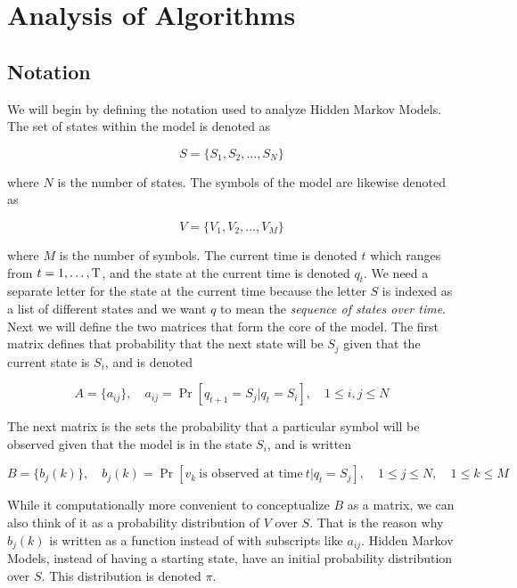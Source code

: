 
\section{Analysis of Algorithms}
\subsection{Notation}

We will begin by defining the notation used to analyze Hidden Markov
Models. The set of states within the model is denoted as

\begin{equation}
  S = \{S_1, S_2, \ldots, S_N \}
\end{equation}

where $N$ is the number of states. The symbols of the model are likewise
denoted as

\begin{equation}
  V = \{V_1, V_2, \ldots, V_M \}
\end{equation}

where $M$ is the number of symbols. The current time is denoted $t$
which ranges from $t=1, \ldots, \mathrm{T}$, and the state at the current
time is denoted $q_t$. We need a separate letter for the state at the
current time because the letter $S$ is indexed as a list of different
states and we want $q$ to mean the \emph{sequence of states over time}.
Next we will define the two matrices that form the core of the model.
The first matrix defines that probability that the next state will be
$S_j$ given that the current state is $S_i$, and is denoted

\begin{equation}
  A = \{a_{ij}\}, \quad a_{ij} = \Pr[q_{t+1} = S_j \vert q_{t} = S_i],
  \quad 1 \leq i,j \leq N
\end{equation}

The next matrix is the sets the probability that a particular symbol
will be observed given that the model is in the state $S_i$, and is
written

\begin{equation}
  B = \{b_j(k)\}, \quad b_j(k) = \Pr[v_k\ \textrm{is observed at time}\ t
  \vert q_t = S_j], \quad 1 \leq j \leq N, \quad 1 \leq k \leq M
\end{equation}

While it computationally more convenient to conceptualize $B$ as a
matrix, we can also think of it as a probability distribution of $V$
over $S$. That is the reason why $b_j(k)$ is written as a function instead of
with subscripts like $a_{ij}$. Hidden Markov Models, instead of having a
starting state, have an initial probability distribution over $S$. This
distribution is denoted $\pi$.

